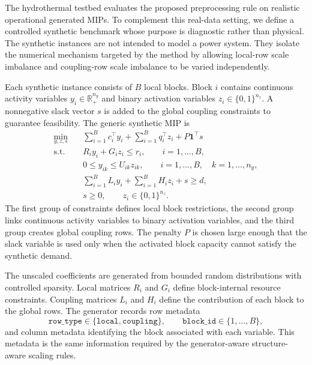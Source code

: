 \documentclass[AMA,Times1COL]{WileyNJDv5} %
\newcommand{\R}{\mathbb{R}}
\providecommand{\DIFadd}[1]{{\protect\color{blue} \sf #1}} %
\providecommand{\DIFdel}[1]{{\protect\color{red} \scriptsize #1}} %
\providecommand{\DIFaddbegin}{} %
\providecommand{\DIFaddend}{} %
\providecommand{\DIFdelbegin}{} %
\providecommand{\DIFdelend}{} %
\begin{document}
The hydrothermal testbed evaluates the proposed preprocessing rule on realistic
operational generated MIPs. To complement this real-data setting, we define a controlled
synthetic benchmark whose purpose is diagnostic rather than physical. The synthetic
instances are not intended to model a power system. They isolate the numerical mechanism
targeted by the method by allowing local-row scale imbalance and coupling-row scale
imbalance to be varied independently.

Each synthetic instance consists of $B$ local blocks. Block $i$ contains continuous
activity variables $y_i\in\R^{n_y}_+$ and binary activation variables
$z_i\in\{0,1\}^{n_z}$. A nonnegative slack vector $s$ is added to the global coupling
constraints to guarantee feasibility. The generic synthetic MIP is
\begin{equation}
\begin{aligned}
\min_{y,z,s}\quad
& \sum_{i=1}^{B} c_i^\top y_i
  + \sum_{i=1}^{B} q_i^\top z_i
  + P\mathbf{1}^\top s \\
\text{s.t.}\quad
& R_i y_i + G_i z_i \le r_i,
  \qquad i=1,\ldots,B,\\
& 0 \le y_{ik} \le U_{ik}z_{ik},
  \qquad i=1,\ldots,B,\quad k=1,\ldots,n_y,\\
& \sum_{i=1}^{B} L_i y_i
  + \sum_{i=1}^{B} H_i z_i
  + s \ge d,\\
& s\ge 0,\qquad z_i\in\{0,1\}^{n_z}.
\end{aligned}
\label{eq:synthetic-mip}
\end{equation}
The first group of constraints defines local block restrictions, the second group links
continuous activity variables to binary activation variables, and the third group creates
global coupling rows. The penalty $P$ is chosen large enough that the slack variable is
used only when the activated block capacity cannot satisfy the synthetic demand.

The unscaled coefficients are generated from bounded random distributions with controlled
sparsity. Local matrices $R_i$ and $G_i$ define block-internal resource constraints.
Coupling matrices $L_i$ and $H_i$ define the contribution of each block to the global rows.
The generator records row metadata
\begin{equation}
\texttt{row\_type}\in\{\texttt{local},\texttt{coupling}\},
\qquad
\texttt{block\_id}\in\{1,\ldots,B\},
\label{eq:synthetic-row-metadata}
\end{equation}
and column metadata identifying the block associated with each variable. This metadata is
the same information required by the \DIFdelbegin \DIFdel{generator-aware }\DIFdelend \DIFaddbegin \DIFadd{structure-aware }\DIFaddend scaling rules.
\end{document}
